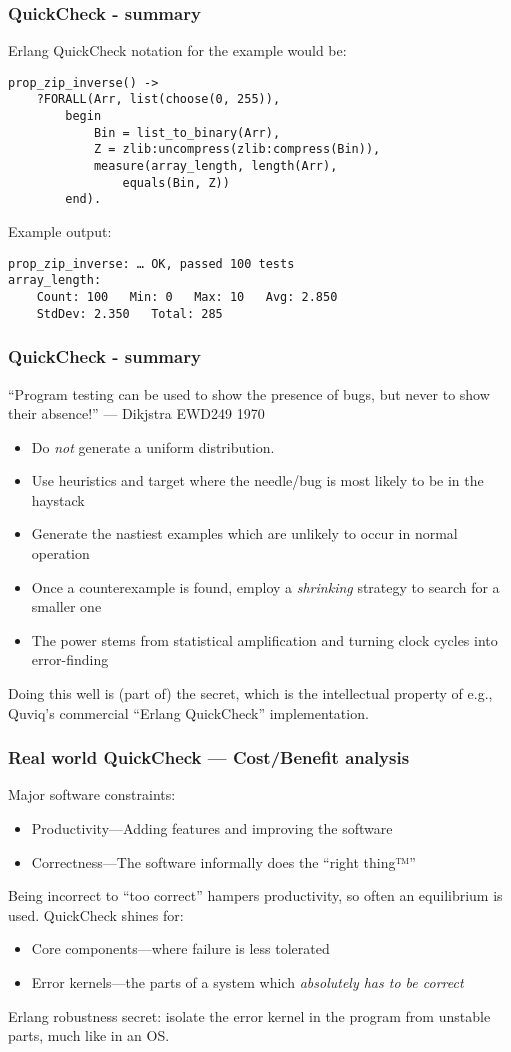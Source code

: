 \documentclass[lualatex]{beamer}
\begin{document}
\begin{frame}[fragile]
\frametitle{QuickCheck - summary}
Erlang QuickCheck notation for the example would be:
\begin{verbatim}
prop_zip_inverse() ->
    ?FORALL(Arr, list(choose(0, 255)),
        begin
            Bin = list_to_binary(Arr),
            Z = zlib:uncompress(zlib:compress(Bin)),
            measure(array_length, length(Arr),
                equals(Bin, Z))
        end).
\end{verbatim}
Example output:
\begin{verbatim}
prop_zip_inverse: … OK, passed 100 tests
array_length:
    Count: 100   Min: 0   Max: 10   Avg: 2.850
    StdDev: 2.350   Total: 285
\end{verbatim}
\end{frame}

\begin{frame}[fragile]
\frametitle{QuickCheck - summary}
``Program testing can be used to show the presence of bugs, but never to show their absence!'' — Dikjstra EWD249 1970

\begin{itemize}
\item Do \emph{not} generate a uniform distribution.
\item Use heuristics and target where the needle/bug is most likely to be in the haystack
\item Generate the nastiest examples which are unlikely to occur in normal operation
\item Once a counterexample is found, employ a \emph{shrinking} strategy to search for a smaller one
\item The power stems from statistical amplification and turning clock cycles into error-finding
\end{itemize}

Doing this well is (part of) the secret, which is the intellectual property of e.g., Quviq's commercial ``Erlang QuickCheck'' implementation.
\end{frame}

\begin{frame}[fragile]
\frametitle{Real world QuickCheck — Cost/Benefit analysis}
Major software constraints:
\begin{itemize}
\item Productivity—Adding features and improving the software
\item Correctness—The software informally does the ``right thing™''
\end{itemize}
Being incorrect to ``too correct'' hampers productivity, so often an equilibrium is used. QuickCheck shines for:
\begin{itemize}
\item Core components—where failure is less tolerated
\item Error kernels—the parts of a system which \emph{absolutely has to be correct}
\end{itemize}
Erlang robustness secret: isolate the error kernel in the program from unstable parts, much like in an OS.
\end{frame}
\end{document}
